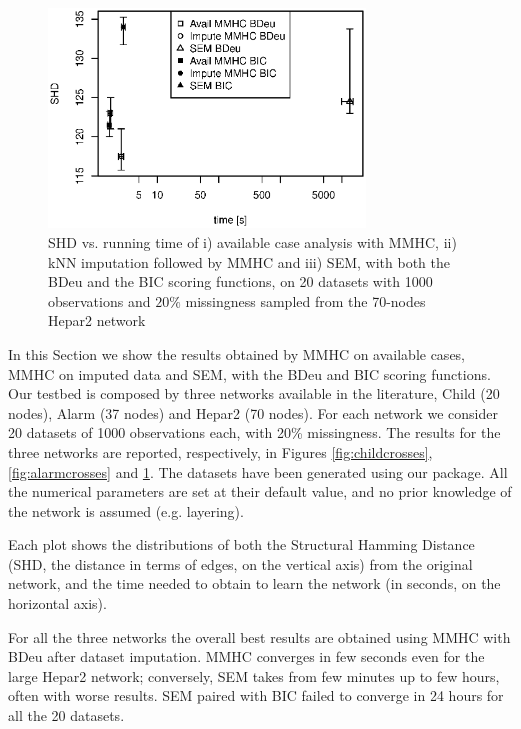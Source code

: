 \documentclass{article}\usepackage[]{graphicx}\usepackage[]{color}
\begin{document}
\begin{figure}[!tpb]%
\centerline{\includegraphics[width=0.75\textwidth]{figure/hepar2_crosses_1000.eps}}
\caption{SHD vs. running time of i) available case analysis with MMHC, ii) kNN imputation followed by MMHC and iii) SEM, with both the BDeu and the BIC scoring functions, on 20 datasets with 1000 observations and $20\%$ missingness sampled from the 70-nodes Hepar2 network}\label{fig:hepar2crosses}
\end{figure}

In this Section we show the results obtained by MMHC on available cases, MMHC on imputed data and SEM, with the BDeu and BIC scoring functions. Our testbed is composed by three networks available in the literature, Child (20 nodes), Alarm (37 nodes) and Hepar2 (70 nodes). For each network we consider 20 datasets of 1000 observations each, with 20\% missingness. The results for the three networks are reported, respectively, in Figures \ref{fig:childcrosses}, \ref{fig:alarmcrosses} and \ref{fig:hepar2crosses}. The datasets have been generated using our package. All the numerical parameters are set at their default value, and no prior knowledge of the network is assumed (e.g. layering).

Each plot shows the distributions of both the Structural Hamming Distance (SHD, the distance in terms of edges, on the vertical axis) from the original network, and the time needed to obtain to learn the network (in seconds, on the horizontal axis).

For all the three networks the overall best results are obtained using MMHC with BDeu after dataset imputation. MMHC converges in few seconds even for the large Hepar2 network; conversely, SEM takes from few minutes up to few hours, often with worse results. SEM paired with BIC failed to converge in 24 hours for all the 20 datasets.
\end{document}
